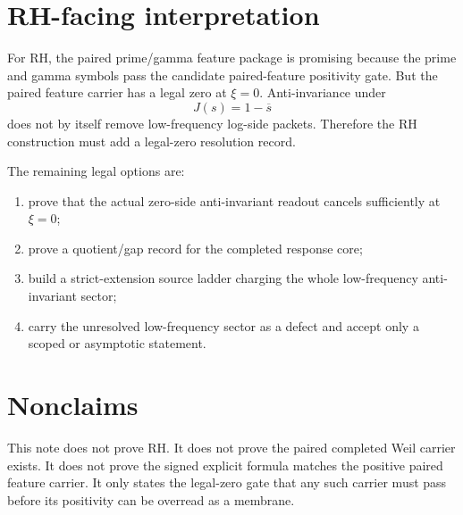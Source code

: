 \documentclass[11pt]{article}
\begin{document}
\section{RH-facing interpretation}
For RH, the paired prime/gamma feature package is promising because the prime and gamma symbols pass the candidate paired-feature positivity gate.  But the paired feature carrier has a legal zero at \(\xi=0\).  Anti-invariance under
\[
J(s)=1-\overline{s}
\]
does not by itself remove low-frequency log-side packets.  Therefore the RH construction must add a legal-zero resolution record.

The remaining legal options are:
\begin{enumerate}[label=(\alph*)]
\item prove that the actual zero-side anti-invariant readout cancels sufficiently at \(\xi=0\);
\item prove a quotient/gap record for the completed response core;
\item build a strict-extension source ladder charging the whole low-frequency anti-invariant sector;
\item carry the unresolved low-frequency sector as a defect and accept only a scoped or asymptotic statement.
\end{enumerate}

\section{Nonclaims}
This note does not prove RH.  It does not prove the paired completed Weil carrier exists.  It does not prove the signed explicit formula matches the positive paired feature carrier.  It only states the legal-zero gate that any such carrier must pass before its positivity can be overread as a membrane.
\end{document}
